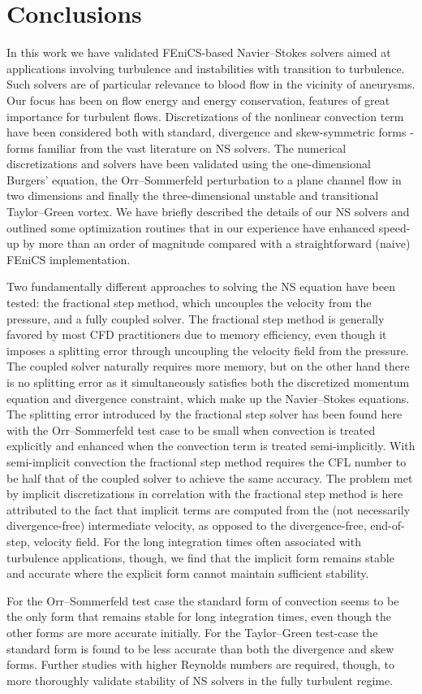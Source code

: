 \section{Conclusions}

In this work we have validated FEniCS-based Navier--Stokes solvers
aimed at applications involving turbulence and instabilities with
transition to turbulence. Such solvers are of particular relevance
to blood flow in the vicinity of aneurysms.  Our focus has been on
flow energy and energy conservation, features of great importance for
turbulent flows. Discretizations of the nonlinear convection term have
been considered both with standard, divergence and skew-symmetric forms
- forms familiar from the vast literature on NS solvers. The numerical
discretizations and solvers have been validated using the one-dimensional
Burgers' equation, the Orr--Sommerfeld perturbation to a plane channel
flow in two dimensions and finally the three-dimensional unstable and
transitional Taylor--Green vortex. We have briefly described the details
of our NS solvers and outlined some optimization routines that in our
experience have enhanced speed-up by more than an order of magnitude
compared with a straightforward (naive) FEniCS implementation.

Two fundamentally different approaches to solving the NS equation have
been tested: the fractional step method, which uncouples the velocity
from the pressure, and a fully coupled solver. The fractional step
method is generally favored by most CFD practitioners due to memory
efficiency, even though it imposes a splitting error through uncoupling
the velocity field from the pressure. The coupled solver naturally
requires more memory, but on the other hand there is no splitting
error as it simultaneously satisfies both the discretized momentum
equation and divergence constraint, which make up the Navier--Stokes
equations. The splitting error introduced by the fractional step solver
has been found here with the Orr--Sommerfeld test case to be small
when convection is treated explicitly and enhanced when the convection
term is treated semi-implicitly. With semi-implicit convection the
fractional step method requires the CFL number to be half that of the
coupled solver to achieve the same accuracy. The problem met by implicit
discretizations in correlation with the fractional step method is here
attributed to the fact that implicit terms are computed from the (not
necessarily divergence-free) intermediate velocity, as opposed to the
divergence-free, end-of-step, velocity field. For the long integration
times often associated with turbulence applications, though, we find
that the implicit form remains stable and accurate where the explicit
form cannot maintain sufficient stability.

For the Orr--Sommerfeld test case the standard form of convection seems
to be the only form that remains stable for long integration times, even
though the other forms are more accurate initially. For the Taylor--Green
test-case the standard form is found to be less accurate than both the
divergence and skew forms. Further studies with higher Reynolds numbers
are required, though, to more thoroughly validate stability of NS solvers
in the fully turbulent regime.

